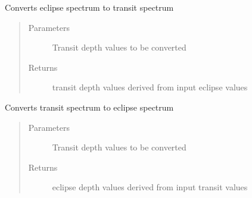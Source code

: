\documentclass[a4paper,10pt,english]{sphinxmanual}
\begin{document}

\begin{fulllineitems}
\label{\detokenize{cascade.exoplanet_tools:cascade.exoplanet_tools.exoplanet_tools.eclipse_to_transit}}
Converts eclipse spectrum to transit spectrum
\begin{quote}\begin{description}
\item[{Parameters}] \leavevmode
{} \textendash{} Transit depth values to be converted

\item[{Returns}] \leavevmode
{} \textendash{} transit depth values derived from input eclipse values

\end{description}\end{quote}

\end{fulllineitems}


\begin{fulllineitems}
\label{\detokenize{cascade.exoplanet_tools:cascade.exoplanet_tools.exoplanet_tools.transit_to_eclipse}}
Converts transit spectrum to eclipse spectrum
\begin{quote}\begin{description}
\item[{Parameters}] \leavevmode
{} \textendash{} Transit depth values to be converted

\item[{Returns}] \leavevmode
{} \textendash{} eclipse depth values derived from input transit values

\end{description}\end{quote}

\end{fulllineitems}
\end{document}
